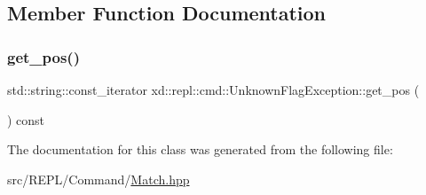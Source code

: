 \subsection{Member Function Documentation}
\mbox{\label{classxd_1_1repl_1_1cmd_1_1_unknown_flag_exception_a40721fcc2c9e1af8c0557572a295d980}} 
\subsubsection{\texorpdfstring{get\+\_\+pos()}{get\_pos()}}
{\footnotesize\ttfamily std\+::string\+::const\+\_\+iterator xd\+::repl\+::cmd\+::\+Unknown\+Flag\+Exception\+::get\+\_\+pos (\begin{DoxyParamCaption}{ }\end{DoxyParamCaption}) const\hspace{0.3cm}{\ttfamily [inline]}}



The documentation for this class was generated from the following file\+:\begin{DoxyCompactItemize}
\item 
src/\+R\+E\+P\+L/\+Command/\mbox{\hyperlink{_command_2_match_8hpp}{Match.\+hpp}}\end{DoxyCompactItemize}
